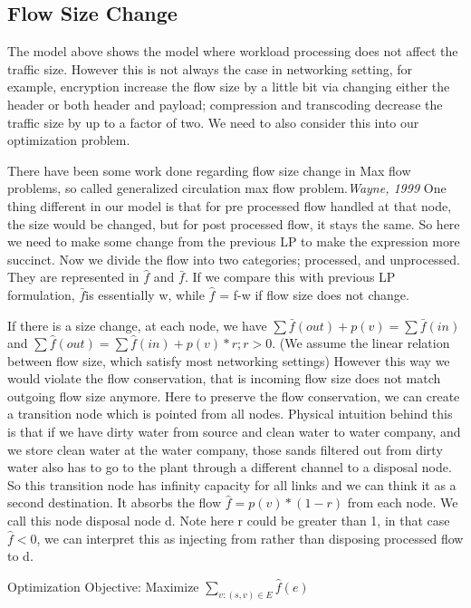 \documentclass{sig-alternate}
\begin{document}
\subsection{Flow Size Change}
The model above shows the model where workload processing does not affect the traffic size. However this is not always the case in networking setting, for example, encryption increase the flow size by a little bit via changing either the header or both header and payload\cite{SIMPLE2013}; compression and transcoding decrease the traffic size by up to a factor of two\cite{Mogul1997}. We need to also consider this into our optimization problem.

There have been some work done regarding flow size change in Max flow problems, so called generalized circulation max flow problem.\emph{Wayne, 1999}\cite{Wayne1999}  One thing different in our model is that for pre processed flow handled at that node, the size would be changed, but for post processed flow, it stays the same. So here we need to make some change from the previous LP to make the expression more succinct. 
Now we divide the flow into two categories; processed, and unprocessed. They are represented in $\hat{f}$ and $\bar{f}$. If we compare this with previous LP formulation, $\bar{f} $is essentially w, while $\hat{f}$ = f-w if flow size does not change. 

If there is a size change, at each node, we have $\sum \bar{f}(out) +p(v)=\sum  \bar{f}(in)$ and $\sum \hat{f}(out)=\sum  \hat{f}(in) + p(v)*r; r>0$. (We assume the linear relation between flow size, which satisfy most networking settings) However this way we would violate the flow conservation, that is incoming flow size does not match outgoing flow size anymore. Here to preserve the flow conservation, we can create a transition node which is pointed from all nodes. Physical intuition behind this is that if we have dirty water from source and clean water to water company, and we store clean water at the water company, those sands filtered out from dirty water also has to go to the plant through a different channel to a disposal node. So this transition node has infinity capacity for all links and we can think it as a second destination. It absorbs the flow $\hat{f} =p(v)*(1-r)$ from each node. We call this node disposal node d. Note here r could be greater than 1, in that case $\hat{f}<0$, we can interpret this as injecting from rather than disposing processed flow to d.

Optimization Objective:
\newline
Maximize $\sum \limits_{v: (s, v) \in E} \hat{f}(e) $
\newline
\end{document}
